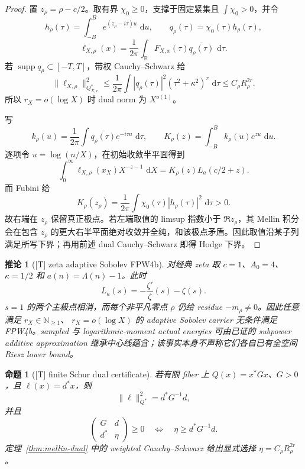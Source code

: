 \documentclass[UTF8,11pt,a4paper]{ctexart}
\newtheorem{proposition}[theorem]{命题}
\newtheorem{corollary}[theorem]{推论}
\theoremstyle{definition}
\theoremstyle{remark}
\newcommand{\R}{\mathbb R}
\newcommand{\dd}{\,\mathrm d}
\newcommand{\1}{\mathbf 1}
\newcommand{\statusT}{\textnormal{[T]}}
\begin{document}
\begin{proof}
置 $z_\rho=\rho-c/2$。取有界 $\chi_0\geq0$，支撑于固定紧集且 $\int\chi_0>0$，并令
\[
 h_\rho(\tau)=\int_{-B}^{B}e^{(z_\rho-i\tau)u}\,\dd u,
 \qquad q_\rho(\tau)=\chi_0(\tau)h_\rho(\tau),
\]
\[
 \ell_{X,\rho}(x)=\frac1{2\pi}\int_\R
 F_{X,x}(\tau)\overline{q_\rho(\tau)}\,\dd\tau .
\]
若 $\operatorname{supp}q_\rho\subset[-T,T]$，带权 Cauchy--Schwarz 给
\[
 \|\ell_{X,\rho}\|_{Q_{X,r}^*}^2
 \leq \frac1{2\pi}\int |q_\rho(\tau)|^2
       (\tau^2+\kappa^2)^r\,\dd\tau
 \leq C_\rho R_\rho^{2r}.
\]
所以 $r_X=o(\log X)$ 时 dual norm 为 $X^{o(1)}$。

写
\[
 k_\rho(u)=\frac1{2\pi}\int
 \overline{q_\rho(\tau)}e^{-i\tau u}\,\dd\tau,\qquad
 K_\rho(z)=\int_{-B}^{B}k_\rho(u)e^{zu}\,\dd u .
\]
逐项令 $u=\log(n/X)$，在初始收敛半平面得到
\[
 \int_0^\infty \ell_{X,\rho}(x_X)X^{-z-1}\,\dd X
   =K_\rho(z)L_a(c/2+z).
\]
而 Fubini 给
\[
 K_\rho(z_\rho)=\frac1{2\pi}\int
 \chi_0(\tau)|h_\rho(\tau)|^2\,\dd\tau>0.
\]
故右端在 $z_\rho$ 保留真正极点。若左端取值的 limsup 指数小于 $\Re z_\rho$，其 Mellin 积分会在包含 $z_\rho$ 的更大右半平面绝对收敛并全纯，和该极点矛盾。因此取值沿某子列满足所写下界；再用前述 dual Cauchy--Schwarz 即得 Hodge 下界。
\end{proof}

\begin{corollary}[\statusT{} zeta adaptive Sobolev FPW4b]\label{cor:zeta-fpw4b}
对经典 zeta 取 $c=1$、$A_0=4$、$\kappa=1/2$ 和 $a(n)=\Lambda(n)-1$。此时
\[
 L_a(s)=-\frac{\zeta'}{\zeta}(s)-\zeta(s).
\]
$s=1$ 的两个主极点相消，而每个非平凡零点 $\rho$ 仍给 residue $-m_\rho\ne0$。因此任意满足 $r_X\in\mathbb N_{\ge1}$、
$r_X=o(\log X)$ 的 adaptive Sobolev carrier 无条件满足 FPW4b。sampled 与 logarithmic-moment actual energies 可由已证的 subpower additive approximation 继承中心线蕴含；该事实本身不声称它们各自已有全空间 Riesz lower bound。
\end{corollary}

\begin{proposition}[\statusT{} finite Schur dual certificate]
若有限 fiber 上 $Q(x)=x^*Gx$、$G>0$，且 $\ell(x)=d^*x$，则
\[
 \|\ell\|_{Q^*}^2=d^*G^{-1}d,
\]
并且
\[
 \begin{pmatrix}G&d\\d^*&\eta\end{pmatrix}\geq0
 \quad\Longleftrightarrow\quad
 \eta\geq d^*G^{-1}d.
\]
定理~\ref{thm:mellin-dual} 中的 weighted Cauchy--Schwarz 给出显式选择 $\eta=C_\rho R_\rho^{2r}$。
\end{proposition}
\end{document}
